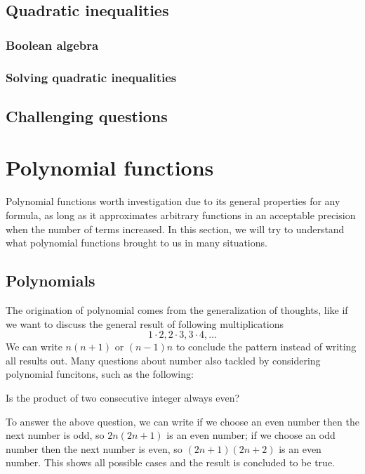 \documentclass[12pt]{article}
\begin{document}
    \subsection{Quadratic inequalities}

    \subsubsection*{Boolean algebra}

    \subsubsection*{Solving quadratic inequalities}

    \subsection{Challenging questions}

    \newpage 

    \section{Polynomial functions}

    Polynomial functions worth investigation due to its general properties for any formula, as long as it approximates arbitrary functions in an acceptable precision when the number of terms increased. In this section, we will try to understand what polynomial functions brought to us in many situations.

    \subsection{Polynomials}

    The origination of polynomial comes from the generalization of thoughts, like if we want to discuss the general result of following multiplications \[1\cdot 2, 2\cdot 3, 3\cdot 4, \dots\]
    We can write $n(n+1)$ or $(n-1)n$ to conclude the pattern instead of writing all results out. Many questions about number also tackled by considering polynomial funcitons, such as the following: 
    
    Is the product of two consecutive integer always even?

    To answer the above question, we can write if we choose an even number then the next number is odd, so $2n(2n+1)$ is an even number; if we choose an odd number then the next number is even, so $(2n+1)(2n+2)$ is an even number. This shows all possible cases and the result is concluded to be true.
\end{document}
